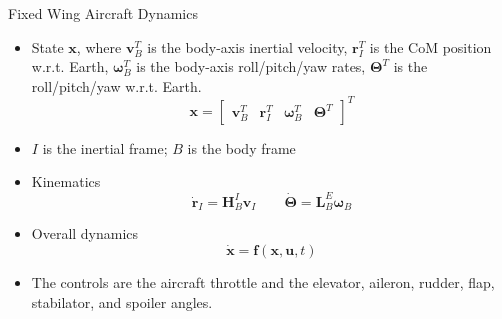 \documentclass[aspectratio=169]{beamer}
\begin{document}
\begin{frame}{Fixed Wing Aircraft Dynamics}
    \begin{itemize}
        \item State $\mathbf{x}$, where $\mathbf{v}_B^T$ is the body-axis inertial velocity, $\mathbf{r}_I^T$ is the CoM position w.r.t. Earth, $\boldsymbol{\omega}_B^T$ is the body-axis roll/pitch/yaw rates, $\boldsymbol{\Theta}^T$ is the roll/pitch/yaw w.r.t. Earth.
        \begin{equation*}
            \mathbf{x} = \begin{bmatrix}
                \mathbf{v}_B^T &
                \mathbf{r}_I^T &
                \boldsymbol{\omega}_B^T &
                \boldsymbol{\Theta}^T
            \end{bmatrix}^T
        \end{equation*}
        \item $I$ is the inertial frame; $B$ is the body frame
        \item Kinematics
        \begin{equation*}
            \dot{\mathbf{r}}_I = \mathbf{H}_B^I \mathbf{v}_I \qquad
            \dot{\boldsymbol{\Theta}} = \mathbf{L}_B^E \boldsymbol{\omega}_B
        \end{equation*}
        \item Overall dynamics
        \begin{equation*}
            \dot{\mathbf{x}} = \mathbf{f}(\mathbf{x},\mathbf{u},t)
        \end{equation*}
        \item The controls are the aircraft throttle and the elevator, aileron, rudder, flap, stabilator, and spoiler angles.
    \end{itemize}
\end{frame}
\end{document}
